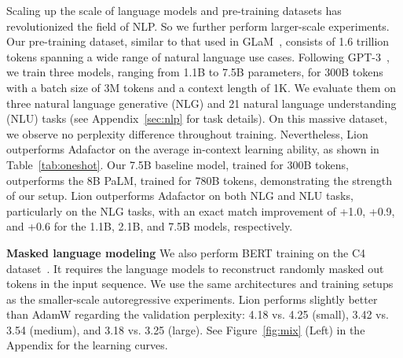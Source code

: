 \documentclass{article}
\newcommand{\name}{Lion}
\begin{document}
Scaling up the scale of language models and pre-training datasets has revolutionized the field of NLP.
So we further perform larger-scale experiments.
Our pre-training dataset, similar to that used in GLaM~\citep{du2022glam}, consists of 1.6 trillion tokens spanning a wide range of natural language use cases.
Following GPT-3~\citep{brown2020gpt3}, we train three models, ranging from 1.1B to 7.5B parameters, for 300B tokens with a batch size of 3M tokens and a context length of 1K.
We evaluate them on three natural language generative (NLG) and 21 natural language understanding (NLU) tasks (see Appendix~\ref{sec:nlp} for task details).
On this massive dataset, we observe no perplexity difference throughout training.
Nevertheless, \name{} outperforms Adafactor on the average in-context learning ability, as shown in Table~\ref{tab:oneshot}.
Our 7.5B baseline model, trained for 300B tokens, outperforms the 8B PaLM, trained for 780B tokens, demonstrating the strength of our setup. \name{} outperforms Adafactor on both NLG and NLU tasks, particularly on the NLG tasks, with an exact match improvement of +1.0, +0.9, and +0.6 for the 1.1B, 2.1B, and 7.5B models, respectively.




\textbf{Masked language modeling}
We also perform BERT training on the C4 dataset~\citep{raffel2020t5}.
It requires the language models to reconstruct randomly masked out tokens in the input sequence.
We use the same architectures and training setups as the smaller-scale autoregressive experiments.
\name{} performs slightly better than AdamW regarding the validation perplexity: 4.18 vs. 4.25 (small), 3.42 vs. 3.54 (medium), and 3.18 vs. 3.25 (large). See Figure~\ref{fig:mix} (Left) in the Appendix for the learning curves.
\end{document}

